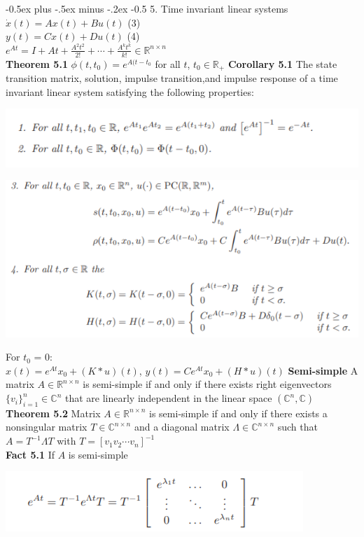\documentclass[10pt,landscape]{article}
\makeatletter
\newenvironment{Figure}
{\par\medskip\noindent\minipage{\linewidth}}
{\endminipage\par\medskip}
\renewcommand{\section}{\@startsection{section}{1}{0mm}%
                                {-0.5ex plus -.5ex minus -.2ex}%
                                {-0.5\baselineskip}%
                                {\normalfont\small\bfseries}}
\makeatother
\begin{document}
\begin{multicols*}{4}
\section{5. Time invariant linear systems}
$\dot{x}(t) = Ax(t) + Bu(t)$ \qquad (3)\\
$y(t) = Cx(t) + Du(t)$ \qquad (4)\\
$e^{At} = I + At + \frac{A^2t^2}{2!} + \cdots + \frac{A^kt^k}{k!} \in \mathbb{R}^{n \times n}$\\
\textbf{Theorem 5.1} $\phi(t, t_0) = e^{A(t-t_0}$ for all $t$, $t_0 \in \mathbb{R}_+$
\textbf{Corollary 5.1} The state transition matrix, solution, impulse transition,and impulse response of a time invariant linear system satisfying the following properties:
\begin{Figure}
	\centering
	\includegraphics[width=\linewidth]{pictures/Col5_1(1).png}
\end{Figure}
\begin{Figure}
	\centering
	\includegraphics[width=\linewidth]{pictures/Col5_1(2).png}
\end{Figure}
For $t_0$ = 0:\\
$x(t) = e^{At}x_0+(K*u)(t)$, 
$y(t) = Ce^{At}x_0+(H*u)(t)$
\textbf{Semi-simple} A matrix $A \in \mathbb{R}^{n \times n}$ is semi-simple if and only if there exists right eigenvectors $\{v_i \}^n_{i=1} \in \mathbb{C}^n$ that are linearly independent in the linear space $(\mathbb{C}^n, \mathbb{C})$ \\
\textbf{Theorem 5.2} Matrix $A \in \mathbb{R}^{n \times n}$ is semi-simple if and only if there exists a nonsingular matrix $T \in \mathbb{C}^{n \times n}$ and a diagonal matrix $\Lambda \in \mathbb{C}^{n \times n}$ such that $A = T^{-1} \Lambda T$ with $T = [v_1 v_2 \cdots v_n]^{-1}$\\
\textbf{Fact 5.1} If $A$ is semi-simple 
\begin{Figure}
	\centering
	\includegraphics[width=\linewidth]{pictures/Fac5_1.png}
\end{Figure}


\end{multicols*}
\end{document}

